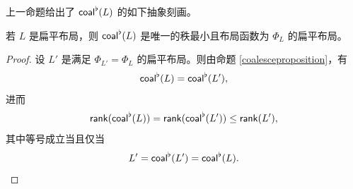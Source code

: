上一命题给出了 $\mathsf{coal}^\flat(L)$ 的如下抽象刻画。

\begin{proposition}\label{characterizationofflatcoalesce}
    若 $L$ 是扁平布局，则 $\mathsf{coal}^\flat(L)$ 是唯一的秩最小且布局函数为 $\Phi_L$ 的扁平布局。
\end{proposition}

\begin{proof}
    设 $L'$ 是满足 $\Phi_{L'} = \Phi_L$ 的扁平布局。则由命题 \ref{coalesceproposition}，有
    \[
    \mathsf{coal}^\flat(L) = \mathsf{coal}^\flat(L'),
    \]
    进而
    \[
    \mathsf{rank}(\mathsf{coal}^\flat(L)) = \mathsf{rank}(\mathsf{coal}^\flat(L')) \leq \mathsf{rank}(L'),
    \]
    其中等号成立当且仅当
    \[
    L ' = \mathsf{coal}^\flat (L') = \mathsf{coal}^\flat(L).
    \]
\end{proof}
